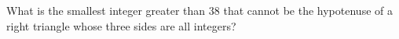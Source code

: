 What is the smallest integer greater than $38$ that cannot be the hypotenuse of a right triangle whose three sides are all integers?
